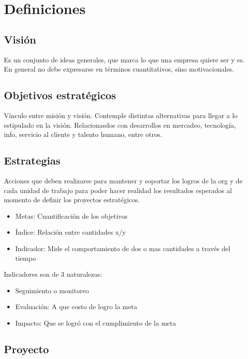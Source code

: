 \documentclass[a4paper, 11pt, oneside]{article}
\begin{document}
\section{Definiciones}

\subsection{Visión}

Es un conjunto de ideas generales, que marca lo que una empresa quiere ser y es. En general 
no debe expresarse en términos cuantitativos, sino motivacionales.

\subsection{Objetivos estratégicos}

Vínculo entre misión y visión. Contemple distintas alternativas para llegar a lo estipulado
en la visión. Relacionasdos con desarrollos en mercadeo, tecnología, info, servicio al cliente 
y talento humano, entre otros.

\subsection{Estrategias}

Acciones que deben realizarse para mantener y soportar los logros de la org y de cada unidad de
trabajo para poder hacer realidad los resultados esperados al momento de definir los proyectos 
estratégicos.

\begin{itemize}
	\item Metas: Cuantificación de los objetivos
	\item Índice: Relación entre cantidades x/y
	\item Indicador: Mide el comportamiento de dos o mas cantidades a través del tiempo
\end{itemize}

Indicadores son de 3 naturalezas:

\begin{itemize}
	\item Seguimiento o monitoreo
	\item Evaluación: A que costo de logro la meta
	\item Impacto: Que se logró con el cumplimiento de la meta
\end{itemize}

\subsection{Proyecto}
\end{document}
